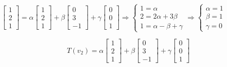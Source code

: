 \documentclass[12pt]{article}
\begin{document}
\begin{itemize}
    $\left[\begin{array}{c}
    1\\
    2\\
    1
    \end{array}\right]=\alpha\left[\begin{array}{c}
    1\\
    2\\
    1
    \end{array}\right]+\beta\left[\begin{array}{c}
    0\\
    3\\
    -1
    \end{array}\right]+\gamma\left[\begin{array}{c}
    0\\
    0\\
    1
    \end{array}\right]\Rightarrow\left\{ \begin{array}{c}
    1=\alpha\\
    2=2\alpha+3\beta\\
    1=\alpha-\beta+\gamma
    \end{array}\Rightarrow\left\{ \begin{array}{c}
        \alpha=1\\
        \beta=1\\
        \gamma=0
    \end{array}\right.\right.$
    
    
    $$T(v_{2})=\alpha\left[\begin{array}{c}
    1\\
    2\\
    1
    \end{array}\right]+\beta\left[\begin{array}{c}
    0\\
    3\\
    -1
    \end{array}\right]+\gamma\left[\begin{array}{c}
    0\\
    0\\
    1
    \end{array}\right]$$
    

\end{itemize}
\end{document}
